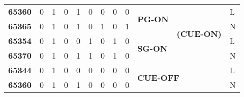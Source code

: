 \begin{table}[hp]
\begin{tabular}{|l|llllllll|l|c|l|}
\textbf{65360}                                                  & 0             & 1                               & 0               & 1           & 0                                & 0                                & 0                                & 0                                & \multirow{2}{*}{\textbf{PG-ON}}                      & \multirow{4}{*}{\textbf{(CUE-ON)}} & L      \\ \cline{1-9} \cline{12-12} 
\textbf{65365}                                                  & 0             & 1                               & 0               & 1           & 0                                & 1                                & 0                                & 1                                &                                                      &                                    & N      \\ \cline{1-10} \cline{12-12} 
\textbf{65354}                                                  & 0             & 1                               & 0               & 0           & 1                                & 0                                & 1                                & 0                                & \multirow{2}{*}{\textbf{SG-ON}}                      &                                    & L      \\ \cline{1-9} \cline{12-12} 
\textbf{65370}                                                  & 0             & 1                               & 0               & 1           & 1                                & 0                                & 1                                & 0                                &                                                      &                                    & N      \\ \hline
\textbf{65344}                                                  & 0             & 1                               & 0               & 0           & 0                                & 0                                & 0                                & 0                                & \multicolumn{2}{l|}{\multirow{2}{*}{\textbf{CUE-OFF}}}                                    & L      \\ \cline{1-9} \cline{12-12} 
\textbf{65360}                                                  & 0             & 1                               & 0               & 1           & 0                                & 0                                & 0                                & 0                                & \multicolumn{2}{l|}{}                                                                     & N      \\ \hline

\end{tabular}
\end{table}
